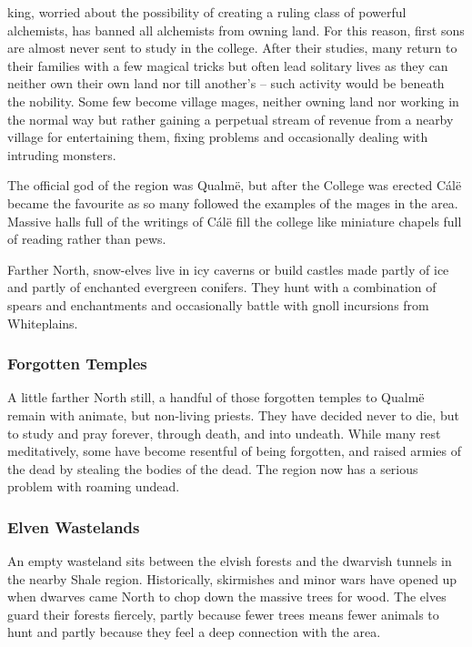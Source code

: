 \begin{multicols}{2}
\Gls{king}, worried about the possibility of creating a ruling class of powerful alchemists, has banned all alchemists from owning land.
For this reason, first sons are almost never sent to study in the college.
After their studies, many return to their families with a few magical tricks but often lead solitary lives as they can neither own their own land nor till another's -- such activity would be beneath the nobility.
Some few become village mages, neither owning land nor working in the normal way but rather gaining a perpetual stream of revenue from a nearby village for entertaining them, fixing problems and occasionally dealing with intruding monsters.

The official god of the region was Qualm\"{e}, but after the College was erected C\'{a}l\"{e} became the favourite as so many followed the examples of the mages in the area.
Massive halls full of the writings of C\'{a}l\"{e} fill the college like miniature chapels full of reading rather than pews.

Farther North, snow-elves live in icy caverns or build castles made partly of ice and partly of enchanted evergreen conifers.
They hunt with a combination of spears and enchantments and occasionally battle with gnoll incursions from Whiteplains.

\subsubsection{Forgotten Temples}

A little farther North still, a handful of those forgotten temples to Qualm\"{e} remain with animate, but non-living priests.
They have decided never to die, but to study and pray forever, through death, and into undeath.
While many rest meditatively, some have become resentful of being forgotten, and raised armies of the dead by stealing the bodies of the dead.
The region now has a serious problem with roaming undead.

\subsubsection{Elven Wastelands}

An empty wasteland sits between the elvish forests and the dwarvish tunnels in the nearby Shale region.
Historically, skirmishes and minor wars have opened up when dwarves came North to chop down the massive trees for wood.
The elves guard their forests fiercely, partly because fewer trees means fewer animals to hunt and partly because they feel a deep connection with the area.


\end{multicols}
